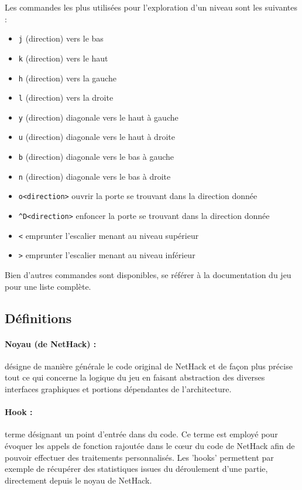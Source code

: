 \documentclass[a4paper,12pt]{article}
\begin{document}
Les commandes les plus utilisées pour l'exploration d'un niveau sont les suivantes :

\begin{itemize}
	\item \verb!j! (direction) vers le bas
	\item \verb!k! (direction) vers le haut
	\item \verb!h! (direction) vers la gauche
	\item \verb!l! (direction) vers la droite
	\item \verb!y! (direction) diagonale vers le haut à gauche
	\item \verb!u! (direction) diagonale vers le haut à droite
	\item \verb!b! (direction) diagonale vers le bas à gauche
	\item \verb!n! (direction) diagonale vers le bas à droite
	\item \verb!o<direction>! ouvrir la porte se trouvant dans la direction donnée
	\item \verb!^D<direction>! enfoncer la porte se trouvant dans la direction donnée
	\item \verb!<! emprunter l'escalier menant au niveau supérieur
	\item \verb!>! emprunter l'escalier menant au niveau inférieur
\end{itemize}

Bien d'autres commandes sont disponibles, se référer à la documentation du
jeu pour une liste complète.

\subsection*{Définitions}

\paragraph{Noyau (de NetHack) :}désigne de manière générale le code original de
NetHack et de façon plus précise tout ce qui concerne la logique du jeu en
faisant abstraction des diverses interfaces graphiques et portions dépendantes
de l'architecture.

\paragraph{Hook :}terme désignant un point d'entrée dans du code. Ce terme est
employé pour évoquer les appels de fonction rajoutée dans le cœur du code
de NetHack afin de pouvoir effectuer des traitements personnalisés. Les
'hooks' permettent par exemple de récupérer des statistiques issues du
déroulement d'une partie, directement depuis le noyau de NetHack.
\end{document}
